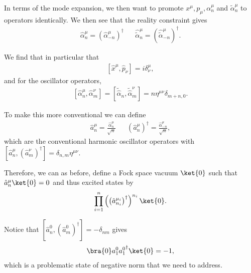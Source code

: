 In terms of the mode expansion, we then want to promote $x^{\mu}, p_\mu, \alpha^{\mu}_n$ and $\widetilde{\alpha}^{\mu}_n$ to operators identically. We then see that the reality constraint gives
\begin{align}
    \hat{\alpha}_n^{\mu} = \left( \hat{\alpha}^{\mu}_{-n} \right)^{\dag} && \hat{\widetilde{\alpha}}_n^{\mu} = \left( \hat{\widetilde{\alpha}}^{\mu}_{-n} \right)^{\dag}
.\end{align}

We find that in particular that
\begin{align}
    \left[ \hat{x}^{\mu}, \hat{p}_\nu \right] = i \delta^{\mu}_\nu
,\end{align}
and for the oscillator operators,
\begin{align}
    \left[ \hat{\alpha}^{\mu}_n, \hat{\alpha}^{\nu}_m \right] = \left[ \widetilde{\hat{\alpha}}_n, \widetilde{\hat{\alpha}}^{\nu}_m \right] = n \eta^{\mu \nu} \delta_{m + n, 0}
.\end{align}

To make this more conventional we can define
\begin{align}
    \hat{a}^{\mu}_n = \frac{\hat{\alpha}^{\mu}_n}{\sqrt{n}} && \left( \hat{a}^{\mu}_n \right)^{\dag} = \frac{\hat{\alpha}^{\mu}_{-n}}{\sqrt{n} }
,\end{align}
which are the conventional harmonic oscillator operators with $\left[ \hat{a}_n^{\mu}, \left( {\hat{a}^{\nu}_m} \right) ^{\dag} \right]  = \delta_{n,m} \eta^{\mu \nu}$.

Therefore, we can as before, define a Fock space vacuum $\ket{0}$ such that $\hat{a}_{n}^{\mu} \ket{0} = 0$ and thus excited states by
\begin{align}
    \prod_{i=1}^{n} \left( \left( {\hat{a}_{n_{i}}^{\mu_{i}}} \right) ^{\dag} \right)^{n_{i}} \ket{0}
.\end{align}


Notice that $\left[ \hat{a}_n^{0}, \left( {\hat{a}_m^{0}} \right) ^{\dag}  \right] = -\delta_{nm}$ gives
\begin{align}
    \bra{0} a_1^{0} {a_1^{0}}^{\dag} \ket{0} = -1
,\end{align}
which is a problematic state of negative norm that we need to address.






